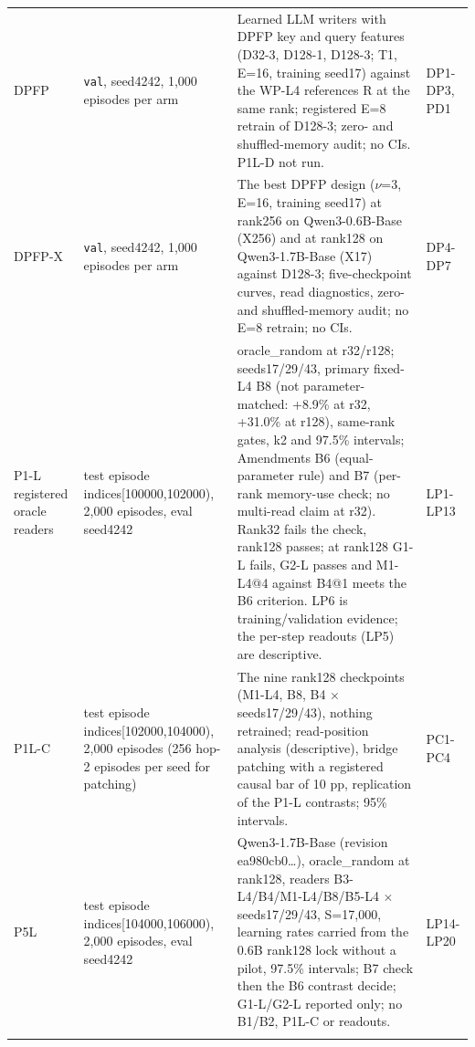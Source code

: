 {\begin{longtable}{W{83}{8}W{346}{8}W{487}{8}W{83}{8}}
DPFP & \texttt{val}, seed4242, 1,000 episodes per arm & Learned LLM writers with DPFP key and query features (D32-3, D128-1, D128-3; T1, E=16, training seed17) against the WP-L4 references R at the same rank; registered E=8 retrain of D128-3; zero- and shuffled-memory audit; no CIs. P1L-D not run. & DP1-DP3, PD1 \\ \addlinespace[3pt]  %
DPFP-X & \texttt{val}, seed4242, 1,000 episodes per arm & The best DPFP design (\ensuremath{\nu}=3, E=16, training seed17) at rank256 on Qwen3-0.6B-Base (X256) and at rank128 on Qwen3-1.7B-Base (X17) against D128-3; five-checkpoint curves, read diagnostics, zero- and shuffled-memory audit; no E=8 retrain; no CIs. & DP4-DP7 \\ \addlinespace[3pt]  %
P1-L registered oracle readers & test episode indices[100000,102000), 2,000 episodes, eval seed4242 & oracle\_random at r32/\allowbreak{}r128; seeds17/\allowbreak{}29/\allowbreak{}43, primary fixed-L4 B8 (not parameter-matched: +8.9\% at r32, +31.0\% at r128), same-rank gates, k2 and 97.5\% intervals; Amendments B6 (equal-parameter rule) and B7 (per-rank memory-use check; no multi-read claim at r32). Rank32 fails the check, rank128 passes; at rank128 G1-L fails, G2-L passes and M1-L4@4 against B4@1 meets the B6 criterion. LP6 is training/\allowbreak{}validation evidence; the per-step readouts (LP5) are descriptive. & LP1-LP13 \\ \addlinespace[3pt]  %
P1L-C & test episode indices[102000,104000), 2,000 episodes (256 hop-2 episodes per seed for patching) & The nine rank128 checkpoints (M1-L4, B8, B4 \ensuremath{\times} seeds17/\allowbreak{}29/\allowbreak{}43), nothing retrained; read-position analysis (descriptive), bridge patching with a registered causal bar of 10 pp, replication of the P1-L contrasts; 95\% intervals. & PC1-PC4 \\ \addlinespace[3pt]  %
P5L & test episode indices[104000,106000), 2,000 episodes, eval seed4242 & Qwen3-1.7B-Base (revision ea980cb0\ldots{}), oracle\_random at rank128, readers B3-L4/\allowbreak{}B4/\allowbreak{}M1-L4/\allowbreak{}B8/\allowbreak{}B5-L4 \ensuremath{\times} seeds17/\allowbreak{}29/\allowbreak{}43, S=17,000, learning rates carried from the 0.6B rank128 lock without a pilot, 97.5\% intervals; B7 check then the B6 contrast decide; G1-L/\allowbreak{}G2-L reported only; no B1/\allowbreak{}B2, P1L-C or readouts. & LP14-LP20 \\ \addlinespace[3pt]  %

\end{longtable}}

